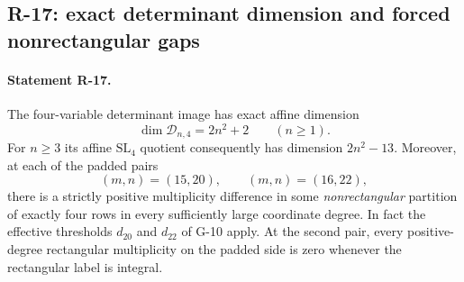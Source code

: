 \subsection{R-17: exact determinant dimension and forced nonrectangular gaps}

\paragraph{Statement R-17.}
The four-variable determinant image has exact affine dimension
\begin{equation}\label{R17:detdimension}
 \dim\mathcal D_{n,4}=2n^2+2\qquad(n\geq1).
\end{equation}
For $n\geq3$ its affine $\mathrm{SL}_4$ quotient consequently
has dimension $2n^2-13$.
Moreover, at each of the padded pairs
\[
 (m,n)=(15,20),\qquad (m,n)=(16,22),
\]
there is a strictly positive multiplicity difference in some
\emph{nonrectangular} partition of exactly four rows in every
sufficiently large coordinate degree. In fact the effective
thresholds $d_{20}$ and $d_{22}$ of G-10 apply. At the second
pair, every positive-degree rectangular multiplicity on the
padded side is zero whenever the rectangular label is integral.

